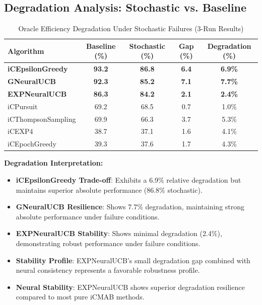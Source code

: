 \documentclass[12pt,a4paper]{article}
\newcommand{\primarytext}[1]{\textcolor{primaryblue}{\textbf{#1}}}
\newcommand{\secondarytext}[1]{\textcolor{secondaryblue}{\textbf{#1}}}
\newcommand{\success}[1]{\textcolor{accentgreen}{\textbf{#1}}}
\newcommand{\legacy}[1]{\textcolor{legacycolor}{\textbf{#1}}}
\newcommand{\neural}[1]{\textcolor{neuralcolor}{\textbf{#1}}}
\begin{document}
\subsection{Degradation Analysis: Stochastic vs. Baseline}

\begin{table}[H]
\centering
\caption{Oracle Efficiency Degradation Under Stochastic Failures (3-Run Results)}
\label{tab:degradation-analysis}
\begin{tabular}{@{}lcccc@{}}
\toprule
\textbf{Algorithm} & \textbf{Baseline (\%)} & \textbf{Stochastic (\%)} & \textbf{Gap (\%)} & \textbf{Degradation (\%)} \\
\midrule
\primarytext{iCEpsilonGreedy}   & \primarytext{93.2} & \primarytext{86.8} & \primarytext{6.4} & \primarytext{6.9\%} \\
\neural{GNeuralUCB}            & \neural{92.3} & \neural{85.2} & \neural{7.1} & \neural{7.7\%} \\
\legacy{EXPNeuralUCB}           & \legacy{86.3} & \legacy{84.2} & \legacy{2.1} & \legacy{2.4\%} \\
iCPursuit                       & 69.2 & 68.5 & 0.7 & 1.0\% \\
iCThompsonSampling              & 69.9 & 66.3 & 3.7 & 5.3\% \\
iCEXP4                          & 38.7 & 37.1 & 1.6 & 4.1\% \\
iCEpochGreedy                   & 39.3 & 37.6 & 1.7 & 4.3\% \\
\bottomrule
\end{tabular}
\end{table}

\textbf{Degradation Interpretation:}
\begin{itemize}
\item \primarytext{iCEpsilonGreedy Trade-off}: Exhibits a 6.9\% relative degradation but maintains superior absolute performance (86.8\% stochastic).
\item \neural{GNeuralUCB Resilience}: Shows 7.7\% degradation, maintaining strong absolute performance under failure conditions.
\item \legacy{EXPNeuralUCB Stability}: Shows minimal degradation (2.4\%), demonstrating robust performance under failure conditions.
\item \secondarytext{Stability Profile}: EXPNeuralUCB's small degradation gap combined with neural consistency represents a favorable robustness profile.
\item \success{Neural Stability}: EXPNeuralUCB shows superior degradation resilience compared to most pure iCMAB methods.
\end{itemize}
\end{document}
